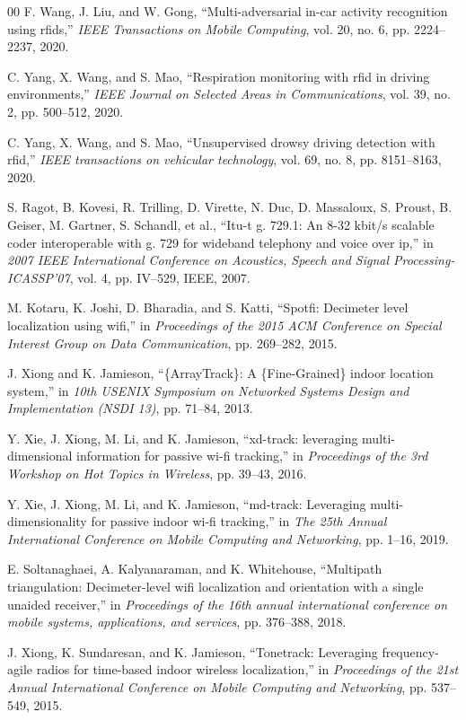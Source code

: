 \documentclass[journal, onecolumn]{IEEEtran}
\begin{document}
\begin{thebibliography}{00}
 F. Wang, J. Liu, and W. Gong, “Multi-adversarial in-car activity recognition using rfids,” \emph{IEEE Transactions on Mobile Computing}, vol. 20, no. 6, pp. 2224–2237, 2020.

 C. Yang, X. Wang, and S. Mao, “Respiration monitoring with rfid in driving environments,” \emph{IEEE Journal on Selected Areas in Communications}, vol. 39, no. 2, pp. 500–512, 2020.

 C. Yang, X. Wang, and S. Mao, “Unsupervised drowsy driving detection with rfid,” \emph{IEEE transactions on vehicular technology}, vol. 69, no. 8, pp. 8151–8163, 2020.

 S. Ragot, B. Kovesi, R. Trilling, D. Virette, N. Duc, D. Massaloux, S. Proust, B. Geiser, M. Gartner, S. Schandl, et al., “Itu-t g. 729.1: An 8-32 kbit/s scalable coder interoperable with g. 729 for wideband telephony and voice over ip,” in \emph{2007 IEEE International Conference on Acoustics, Speech and Signal Processing-ICASSP’07}, vol. 4, pp. IV–529, IEEE, 2007.

 M. Kotaru, K. Joshi, D. Bharadia, and S. Katti, “Spotfi: Decimeter level localization using wifi,” in \emph{Proceedings of the 2015 ACM Conference on Special Interest Group on Data Communication}, pp. 269–282, 2015.

 J. Xiong and K. Jamieson, “\{ArrayTrack\}: A \{Fine-Grained\} indoor location system,” in \emph{10th USENIX Symposium on Networked Systems Design and Implementation (NSDI 13)}, pp. 71–84, 2013.

 Y. Xie, J. Xiong, M. Li, and K. Jamieson, “xd-track: leveraging multi-dimensional information for passive wi-fi tracking,” in \emph{Proceedings of the 3rd Workshop on Hot Topics in Wireless}, pp. 39–43, 2016.

 Y. Xie, J. Xiong, M. Li, and K. Jamieson, “md-track: Leveraging multi-dimensionality for passive indoor wi-fi tracking,” in \emph{The 25th Annual International Conference on Mobile Computing and Networking}, pp. 1–16, 2019.

 E. Soltanaghaei, A. Kalyanaraman, and K. Whitehouse, “Multipath triangulation: Decimeter-level wifi localization and orientation with a single unaided receiver,” in \emph{Proceedings of the 16th annual international conference on mobile systems, applications, and services}, pp. 376–388, 2018.

 J. Xiong, K. Sundaresan, and K. Jamieson, “Tonetrack: Leveraging frequency-agile radios for time-based indoor wireless localization,” in \emph{Proceedings of the 21st Annual International Conference on Mobile Computing and Networking}, pp. 537–549, 2015.


\end{thebibliography}
\end{document}
